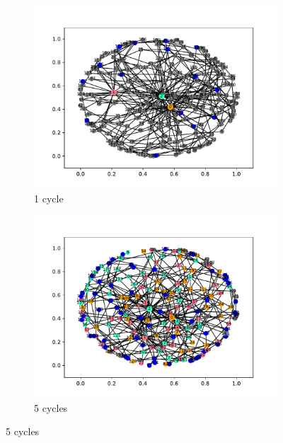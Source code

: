 \begin{figure}[!h]
  \centering
  \begin{subfigure}[t]{.45\textwidth}
    \centering
    \includegraphics[trim={1cm .5cm 1cm 1cm}, clip, width=\linewidth]{img/pdf/plot-0001.pdf} 
    \caption{1 cycle}
    \label{fig:1}
  \end{subfigure}
  \begin{subfigure}[t]{.45\textwidth}
    \centering
    \includegraphics[trim={1cm .5cm 1cm 1cm}, clip, width=\linewidth]{img/pdf/plot-0005.pdf} 
    \caption{5 cycles}
    \label{fig:5}
  \end{subfigure}

  \vspace{0cm}


\end{figure}
